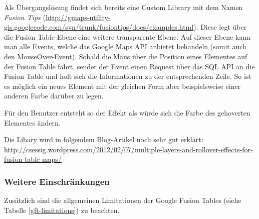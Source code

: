 Als Übergangslösung findet sich bereits eine Custom Library mit dem Namen \emph{Fusion Tips} (\url{http://gmaps-utility-gis.googlecode.com/svn/trunk/fusiontips/docs/examples.html}). Diese legt über die Fusion Table-Ebene eine weitere transparente Ebene. Auf dieser Ebene kann man alle Events, welche das Google Maps API anbietet behandeln (somit auch den MouseOver-Event). Sobald die Maus über die Position eines Elementes auf der Fusion Table fährt, sendet der Event einen Request über das SQL API an die Fusion Table und holt sich die Informationen zu der entsprechenden Zeile. So ist es möglich ein neues Element mit der gleichen Form aber beispielsweise einer anderen Farbe darüber zu legen.

Für den Benutzer entsteht so der Effekt als würde sich die Farbe des gehoverten Elementes ändern.

Die Libary wird in folgendem Blog-Artikel noch sehr gut erklärt: \url{http://csessig.wordpress.com/2012/02/07/multiple-layers-and-rollover-effects-for-fusion-table-maps/}

\subsubsection{Weitere Einschränkungen}
Zusätzlich sind die allgemeinen Limitationen der Google Fusion Tables (siehe Tabelle \ref{gft-limitations}) zu beachten.
